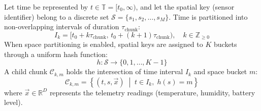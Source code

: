 \documentclass[conference,a4paper]{IEEEtran}
\begin{document}
Let time be represented by $t \in \mathbb{T} = [t_0, \infty)$, and let the spatial key (sensor identifier) belong to a discrete set $\mathcal{S} = \{s_1, s_2, \dots, s_M\}$. Time is partitioned into non-overlapping intervals of duration $\tau_{\mathrm{chunk}}$:
\begin{equation}
    I_k = [t_0 + k\tau_{\mathrm{chunk}},\, t_0 + (k+1)\tau_{\mathrm{chunk}}), \quad k \in \mathbb{Z}_{\ge 0}
\end{equation}
When space partitioning is enabled, spatial keys are assigned to $K$ buckets through a uniform hash function:
\begin{equation}
    h: \mathcal{S} \to \{0, 1, \dots, K-1\}
\end{equation}
A child chunk $\mathcal{C}_{k, m}$ holds the intersection of time interval $I_k$ and space bucket $m$:
\begin{equation}
    \mathcal{C}_{k, m} = \left\{ (t, s, \vec{x}) \;\middle|\; t \in I_k, \; h(s) = m \right\}
\end{equation}
where $\vec{x} \in \mathbb{R}^D$ represents the telemetry readings (temperature, humidity, battery level).
\end{document}
